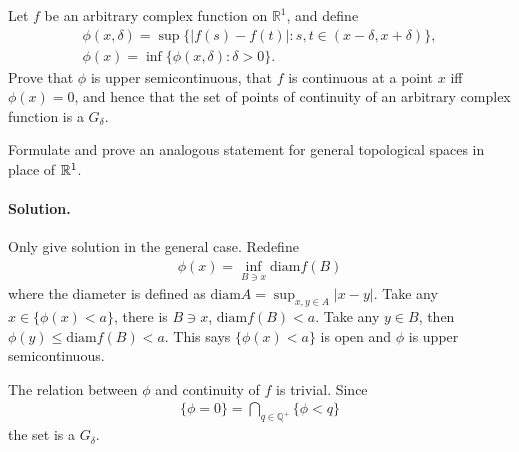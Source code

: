 \documentclass[../main.tex]{subfiles}
\begin{document}
 \begin{exercise}
   Let $ f $ be an arbitrary complex function on $ \mathbb R^1 $, and define
   \begin{align*}
   \phi(x, \delta) = \sup \{|f(s) - f(t)|: s, t \in (x - \delta, x + \delta)\}, \\
   \phi(x) = \inf \{\phi(x, \delta): \delta > 0\}.
   \end{align*}
   Prove that $ \phi $ is upper semicontinuous, that $ f $ is continuous at a point $ x $ iff $ \phi(x) = 0 $, and
   hence that the set of points of continuity of an arbitrary complex function is a $ G_{\delta} $.

   Formulate and prove an analogous statement for general topological spaces in place of $ \mathbb R^1 $.

   \paragraph{Solution. }
   Only give solution in the general case. Redefine
   \begin{align*}
   \phi(x) = \inf_{B \ni x} \mathrm{diam} f(B)
   \end{align*}
   where the diameter is defined as $ \mathrm{diam} A = \sup_{x, y \in A} |x - y| $. Take any $ x \in \{\phi(x) < a\}$,
   there is $ B \ni x $, $ \mathrm{diam} f(B) < a $. Take any $ y \in B $, then $ \phi(y) \le \mathrm{diam}f(B) < a $.
   This says $  \{\phi(x) < a\} $ is open and $ \phi $ is upper semicontinuous.

   The relation between $ \phi $ and continuity of $ f $ is trivial. Since
   \begin{align*}
   \{\phi = 0\} = \bigcap_{q\in \mathbb Q^+} \{\phi < q\}
   \end{align*}
   the set is a $ G_\delta $.
 \end{exercise}
\end{document}
